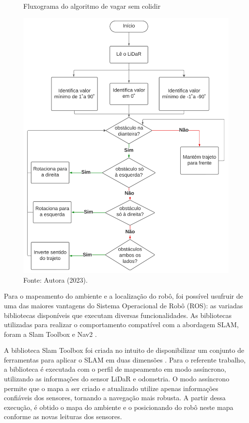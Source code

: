 \begin{figure}[h]
    \centering
    \caption{Fluxograma do algoritmo de vagar sem colidir}
    \includegraphics[scale=0.5]{fluxogramaEvitarObstaculos.png}
    
    \caption*{Fonte: Autora (2023).}
    \label{fig:fluxogramaEvitarObstaculos}
\end{figure}

Para o mapeamento do ambiente e a localização do robô, foi possível usufruir de uma das maiores vantagens do Sistema Operacional de Robô (ROS): as variadas bibliotecas disponíveis que executam diversas funcionalidades. As bibliotecas utilizadas para realizar o comportamento compatível com a abordagem SLAM, foram a  Slam Toolbox  e Nav2 \cite{nav2, slamtoolbox}.

A biblioteca Slam Toolbox foi criada no intuito de disponibilizar um conjunto de ferramentas para aplicar o SLAM em duas dimensões \cite{slamtoolbox}. Para o referente trabalho, a biblioteca é executada com o perfil de mapeamento em modo assíncrono, utilizando as informações do sensor LiDaR e odometria.  O modo assíncrono permite que o mapa a ser criado e atualizado utilize apenas informações confiáveis dos sensores, tornando a navegação mais robusta. A partir dessa execução, é obtido o mapa do ambiente e o posicionando do robô neste mapa conforme as novas leituras dos sensores.

